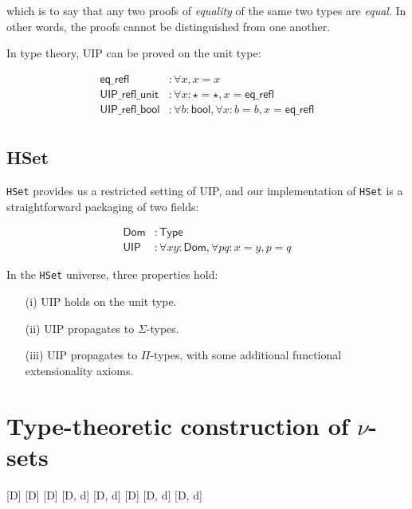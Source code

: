 \documentclass[10pt]{art.cls/art}
\newcommand{\unitpoint}{\star}
\begin{document}
which is to say that any two proofs of \emph{equality} of the same two types are \emph{equal}. In other words, the proofs cannot be distinguished from one another.

In type theory, UIP can be proved on the unit type:

\begin{align*}
  \mathsf{eq\_refl}        & : \forall x, x = x                                                    \\
  \mathsf{UIP\_refl\_unit} & : \forall x : \unitpoint = \unitpoint, x = \mathsf{eq\_refl}          \\
  \mathsf{UIP\_refl\_bool} & : \forall b : \mathsf{bool}, \forall x : b = b, x = \mathsf{eq\_refl} \\
\end{align*}

\subsection{HSet}
\texttt{HSet} provides us a restricted setting of UIP, and our implementation of \texttt{HSet} is a straightforward packaging of two fields:

\begin{align*}
  \mathsf{Dom} & : \mathsf{Type}                                          \\
  \mathsf{UIP} & : \forall x y : \mathsf{Dom}, \forall p q : x = y, p = q
\end{align*}

In the \texttt{HSet} universe, three properties hold:

\begin{enumerate}
  \item[(i)] UIP holds on the unit type.
  \item[(ii)] UIP propagates to $\Sigma$-types.
  \item[(iii)] UIP propagates to $\Pi$-types, with some additional functional extensionality axioms.
\end{enumerate}

\section{Type-theoretic construction of \texorpdfstring{$\nu$}{nu}-sets}
%
[D]
[D]
[D]
[D, d]
[D, d]
[D]
[D, d]
[D, d]
\end{document}
